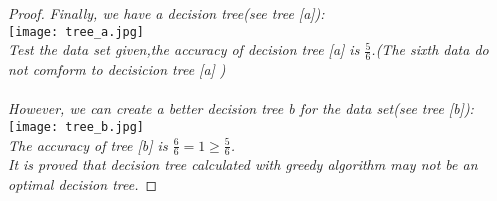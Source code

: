\documentclass{article} %
\newtheorem{proof}{Answer}
\begin{document}
\begin{proof}
\emph{Finally, we have a decision tree(see tree [a]):\\}
\texttt{[image: tree\_a.jpg]}\\
\emph{Test the data set given,the accuracy of decision tree [a] is $\frac{5}{6}$.(The sixth data do not comform to decisicion tree [a] )\\\\
However, we can create a better decision tree b for the data set(see tree [b]):\\}
\texttt{[image: tree\_b.jpg]}\\
\emph{The accuracy of tree [b] is $\frac{6}{6} = 1 \geq \frac{5}{6}$.\\
It is proved that decision tree calculated with greedy algorithm may not be an optimal decision tree.}
\end{proof}







% 
%
%
%
% 
%
\end{document}
